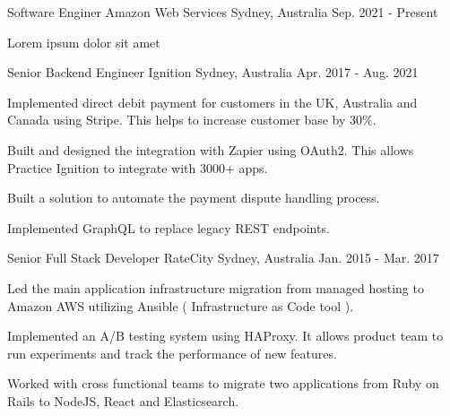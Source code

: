 
\begin{cventries}

  \cventry
    {Software Enginer} %
    {Amazon Web Services} %
    {Sydney, Australia} %
    {Sep. 2021 - Present} %
    {
      \begin{cvitems} %
        \item {Lorem ipsum dolor sit amet}
      \end{cvitems}
    }

  \cventry
    {Senior Backend Engineer} %
    {Ignition} %
    {Sydney, Australia} %
    {Apr. 2017 - Aug. 2021} %
    {
      \begin{cvitems} %
        \item {Implemented direct debit payment for customers in the UK, Australia and Canada using Stripe. This helps to increase customer base by 30\%.}
        \item {Built and designed the integration with Zapier using OAuth2. This allows Practice Ignition to integrate with 3000+ apps.}
        \item {Built a solution to automate the payment dispute handling process.}
        \item {Implemented GraphQL to replace legacy REST endpoints.}
      \end{cvitems}
    }

  \cventry
    {Senior Full Stack Developer} %
    {RateCity} %
    {Sydney, Australia} %
    {Jan. 2015 - Mar. 2017} %
    {
      \begin{cvitems} %
        \item {Led the main application infrastructure migration from managed hosting to Amazon AWS utilizing Ansible ( Infrastructure as Code tool ).}
        \item {Implemented an A/B testing system using HAProxy. It allows product team to run experiments and track the performance of new features.}
        \item {Worked with cross functional teams to migrate two applications from Ruby on Rails to NodeJS, React and Elasticsearch.}
      \end{cvitems}
    }


\end{cventries}
